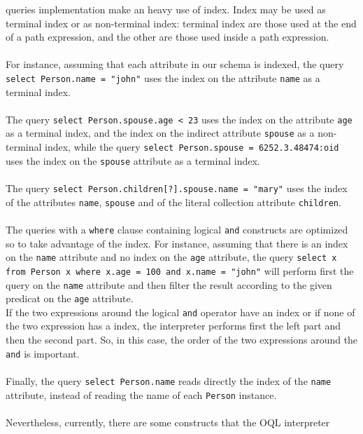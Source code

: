 \eyedb queries implementation make an heavy use of index.
Index may be used as terminal index or as non-terminal index:
terminal index are those used at the end of a path expression, and
the other are those used inside a path expression.\\\\
For instance, assuming that each attribute in our schema is indexed,
the query \texttt{select Person.name = "john"} uses
the index on the attribute \texttt{name} as
a terminal index.\\\\
The query \texttt{select Person.spouse.age < 23} uses
the index on the attribute \texttt{age} as a terminal
index, and the index on the indirect attribute \texttt{spouse}
as a non-terminal index, while the query \texttt{select Person.spouse
= 6252.3.48474:oid} uses the index on the \texttt{spouse} attribute as a
terminal index.\\
\\
The query \texttt{select Person.children[?].spouse.name = "mary"}
uses the index of the attributes \texttt{name}, \texttt{spouse}
and of the literal collection attribute \texttt{children}.
\\
\\
The queries with a \texttt{where} clause containing logical \texttt{and}
constructs are optimized so to take advantage of the index. For instance,
assuming that there is an index on the \texttt{name} attribute and no
index on the \texttt{age} attribute, the query
\texttt{select x from Person x where x.age = 100 and x.name = "john"}
will perform first the query on the \texttt{name} attribute and then
filter the result according to the given predicat on the \texttt{age}
attribute.\\
If the two expressions around the logical \texttt{and} operator
have an index or if none of the two expression has a index,
the interpreter performs first the left part and then the second part.
So, in this case, the order of the two expressions around the \texttt{and}
is important.
\\
\\
Finally, the query \texttt{select Person.name} reads directly the index
of the \texttt{name} attribute, instead of reading the name of each
\texttt{Person} instance.
\\
\\
Nevertheless, currently, there are some constructs that the OQL interpreter
